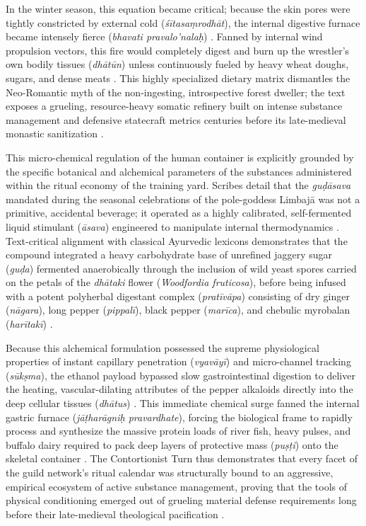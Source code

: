 \documentclass[11pt,twoside,letterpaper]{article}
\begin{document}
In the winter season, this equation became critical; because the skin pores were tightly constricted by external cold (\textit{\'s\={i}tasa\d{m}rodh\={a}t}), the internal digestive furnace became intensely fierce (\textit{bhavati pravalo’nala\d{h}}) \citep{MP_7_v26}. Fanned by internal wind propulsion vectors, this fire would completely digest and burn up the wrestler's own bodily tissues (\textit{dh\={a}t\={u}n}) unless continuously fueled by heavy wheat doughs, sugars, and dense meats \citep{MP_7_v27}. This highly specialized dietary matrix dismantles the Neo-Romantic myth of the non-ingesting, introspective forest dweller; the text exposes a grueling, resource-heavy somatic refinery built on intense substance management and defensive statecraft metrics centuries before its late-medieval monastic sanitization \citep{MP_7_v28, Wujastyk2025}.

This micro-chemical regulation of the human container is explicitly grounded by the specific botanical and alchemical parameters of the substances administered within the ritual economy of the training yard. Scribes detail that the \textit{gu\d{d}\={a}sava} mandated during the seasonal celebrations of the pole-goddess Limbaj\={a} was not a primitive, accidental beverage; it operated as a highly calibrated, self-fermented liquid stimulant (\textit{\={a}sava}) engineered to manipulate internal thermodynamics \citep{Sandesara1948}. Text-critical alignment with classical Ayurvedic lexicons demonstrates that the compound integrated a heavy carbohydrate base of unrefined jaggery sugar (\textit{gu\d{d}a}) fermented anaerobically through the inclusion of wild yeast spores carried on the petals of the \textit{dh\={a}taki} flower (\textit{Woodfordia fruticosa}), before being infused with a potent polyherbal digestant complex (\textit{prat\={i}v\={a}pa}) consisting of dry ginger (\textit{n\={a}gara}), long pepper (\textit{pippal\={i}}), black pepper (\textit{mar\={i}ca}), and chebulic myrobalan (\textit{har\={i}tak\={i}}) \citep{MP_7_v29, Sandesara1948}. 

Because this alchemical formulation possessed the supreme physiological properties of instant capillary penetration (\textit{vyav\={a}y\={i}}) and micro-channel tracking (\textit{s\={u}k\d{s}ma}), the ethanol payload bypassed slow gastrointestinal digestion to deliver the heating, vascular-dilating attributes of the pepper alkaloids directly into the deep cellular tissues (\textit{dh\={a}tus}) \citep{Wujastyk2025}. This immediate chemical surge fanned the internal gastric furnace (\textit{j\={a}\d{t}har\={a}gni\d{h} pravardhate}), forcing the biological frame to rapidly process and synthesize the massive protein loads of river fish, heavy pulses, and buffalo dairy required to pack deep layers of protective mass (\textit{pu\d{s}\d{t}i}) onto the skeletal container \citep{MP_7_v30}. The Contortionist Turn thus demonstrates that every facet of the guild network's ritual calendar was structurally bound to an aggressive, empirical ecosystem of active substance management, proving that the tools of physical conditioning emerged out of grueling material defense requirements long before their late-medieval theological pacification \citep{MP_7_v31, Sandesara1948, Wujastyk2025}.
\end{document}
